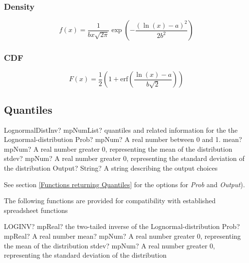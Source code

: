 \subsubsection{Density}
\label{LognormalDistributionDensity}

\begin{equation} 
	f(x)= \frac{1}{b x \sqrt{2\pi}} \exp \left(- \frac{(\ln(x) - a)^2}{2b^2}\right)
\end{equation}


\subsubsection{CDF}
\label{LognormalDistributionCDF}
\begin{equation} 
	F(x)= \frac{1}{2}  \left(1+\text{erf} \left( \frac{\ln(x) - a}{b\sqrt{2}}\right)\right)
\end{equation}



\subsection{Quantiles}
\label{LognormalDistributionQuantiles}


\begin{mpFunctionsExtract}
	\mpFunctionFourNotImplemented
	{LognormalDistInv? mpNumList? quantiles and related information for the the Lognormal-distribution}
	{Prob? mpNum? A real number between 0 and 1.}
	{mean? mpNum? A real number greater 0, representing the mean of the distribution}
	{stdev? mpNum? A real number greater 0, representing the standard deviation of the distribution}
	{Output? String? A string describing the output choices}
\end{mpFunctionsExtract}

See section \ref{Functions returning Quantiles} for the options for  {\itshape\sffamily Prob} and {\itshape\sffamily Output}). 

\vspace{0.3cm}

The following functions are provided for compatibility with established spreadsheet functions

\vspace{0.3cm}
\begin{mpFunctionsExtract}
	\mpWorksheetFunctionThreeNotImplemented
	{LOGINV? mpReal? the two-tailed inverse of the Lognormal-distribution}
	{Prob? mpReal? A real number}
	{mean? mpNum? A real number greater 0, representing the mean of the distribution}
	{stdev? mpNum? A real number greater 0, representing the standard deviation of the distribution}
\end{mpFunctionsExtract}

